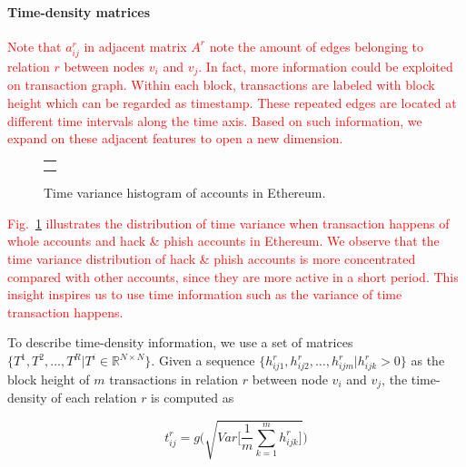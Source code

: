 \paragraph{Time-density matrices}
\textcolor{red}{Note that $a^r_{ij}$ in adjacent matrix $A^r$ note the amount of edges belonging to relation $r$ between nodes $v_i$ and $v_j$.}
\textcolor{red}{In fact, more information could be exploited on transaction graph. Within each block, transactions are labeled with block height which can be regarded as timestamp. These repeated edges are located at different time intervals along the time axis. Based on such information, we expand on these adjacent features to open a new dimension.}


 
\begin{figure}[htbp]
\centering
\begin{tabular}{c}
	\subfigure[Time variance histogram of whole nodes.]{
		\label{fig:high_order}
    
	}\\
	\subfigure[Time variance histogram of hack\&phish nodes.]{
		\label{fig:asymmetric}
    
	}
\end{tabular}
\caption{Time variance histogram of accounts in Ethereum.}
\label{fig:time_std}
\end{figure}

\textcolor{red}{Fig.~\ref{fig:time_std} illustrates the distribution of time variance when transaction happens of whole accounts and hack \& phish accounts in Ethereum. We observe that the time variance distribution of hack \& phish accounts is more concentrated compared with other accounts, since they are more active in a short period. This insight inspires us to use time information such as the variance of time transaction happens.}

To describe time-density information, we use a set of matrices $\{T^1,T^2,\dots,T^R|T^i\in \mathbb{R}^{N \times N}\}$. Given a sequence $\{h_{ij1}^r,h_{ij2}^r,\dots,h_{ijm}^r | h_{ijk}^r>0\}$ as the block height of $m$ transactions in relation $r$ between node $v_i$ and $v_j$, the time-density of each relation $r$ is computed as%

\begin{equation}
t_{ij}^r=g\Bigg(\sqrt{Var\Big[\frac{1}{m}\sum_{k=1}^m h_{ijk}^r\Big]}\Bigg)
\label{eq:time}
\end{equation}

